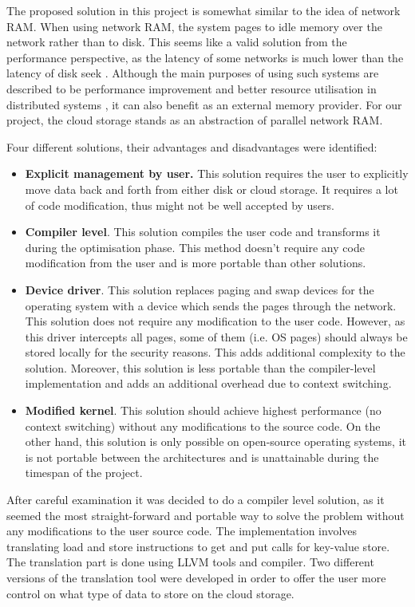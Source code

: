 \documentclass[bsc,frontabs,twoside,singlespacing,parskip,deptreport]{infthesis}     %
\begin{document}
The proposed solution in this project is somewhat similar to the idea of network RAM. When using network RAM, the system pages to idle memory over the network rather than to disk. This seems like a valid solution from the performance perspective, as the latency of some networks is much lower than the latency of disk seek \citep{numbers_should_know}. Although the main purposes of using such systems are described to be performance improvement \citep{Anderson:1998:ENR:893677} and better resource utilisation in distributed systems \citep{1327942}, it can also benefit as an external memory provider. For our project, the cloud storage stands as an abstraction of parallel network RAM. 

Four different solutions, their advantages and disadvantages were identified:

\begin{itemize}
\item
\textbf{Explicit management by user.} This solution requires the user to explicitly move data back and forth from either disk or cloud storage. It requires a lot of code modification, thus might not be well accepted by users.
\item
\textbf{Compiler level}. This solution compiles the user code and transforms it during the optimisation phase. This method doesn't require any code modification from the user and is more portable than other solutions.
\item
\textbf{Device driver}. This solution replaces paging and swap devices for the operating system with a device which sends the pages through the network. This solution does not require any modification to the user code. However, as this driver intercepts all pages, some of them (i.e. OS pages) should always be stored locally for the security reasons. This adds additional complexity to the solution. Moreover, this solution is less portable than the compiler-level implementation and adds an additional overhead due to context switching.
\item
\textbf{Modified kernel}. This solution should achieve highest performance (no context switching) without any modifications to the source code. On the other hand, this solution is only possible on open-source operating systems, it is not portable between the architectures and is unattainable during the timespan of the project.
\end{itemize}

After careful examination it was decided to do a compiler level solution, as it seemed the most straight-forward and portable way to solve the problem without any modifications to the user source code. The implementation involves translating load and store instructions to get and put calls for key-value store. The translation part is done using LLVM tools and compiler. Two different versions of the translation tool were developed in order to offer the user more control on what type of data to store on the cloud storage.
\end{document}
